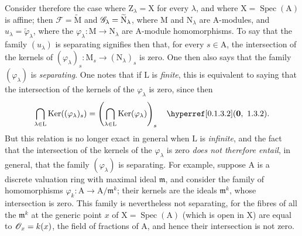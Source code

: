 \begin{env}[11.9.4]
\label{IV.11.9.4}
Consider therefore the case where $\mathrm{Z}_\lambda=\mathrm{X}$ for every $\lambda$, and where $\mathrm{X}=\operatorname{Spec}(\mathrm{A})$ is affine; then $\mathscr{F}=\widetilde{\mathrm{M}}$ and $\mathscr{G}_\lambda=\widetilde{\mathrm{N}}_\lambda$, where $\mathrm{M}$ and $\mathrm{N}_\lambda$ are $\mathrm{A}$-modules, and $u_\lambda=\widetilde{\varphi}_\lambda$, where the $\varphi_\lambda:\mathrm{M}\to\mathrm{N}_\lambda$ are $\mathrm{A}$-module homomorphisms.
To say that the family $(u_\lambda)$ is separating signifies then that, for every $s\in\mathrm{A}$, the intersection of the kernels of $(\varphi_\lambda)_s:\mathrm{M}_s\to(\mathrm{N}_\lambda)_s$ is zero.
One then also says that the family $(\varphi_\lambda)$ is \emph{separating}.
One notes that if $\mathrm{L}$ is \emph{finite}, this is equivalent to saying that the intersection of the kernels of the $\varphi_\lambda$ is zero, since then
\[
  \bigcap_{\lambda\in\mathrm{L}}\operatorname{Ker}((\varphi_\lambda)_s)
  =\left(\bigcap_{\lambda\in\mathrm{L}}\operatorname{Ker}(\varphi_\lambda)\right)_s
  \quad \sref[0]{0.1.3.2}.
\]
But this relation is no longer exact in general
when $\mathrm{L}$ is \emph{infinite}, and the fact that the intersection of the kernels of the $\varphi_\lambda$ is zero \emph{does not therefore entail},
in general, that the family $(\varphi_\lambda)$ is separating.
For example, suppose $\mathrm{A}$ is a discrete valuation ring with maximal ideal $\mathfrak{m}$, and consider the family of homomorphisms $\varphi_k:\mathrm{A}\to\mathrm{A}/\mathfrak{m}^k$; their kernels are the ideals $\mathfrak{m}^k$, whose intersection is zero. This family is nevertheless not separating, for the fibres of all the $\mathfrak{m}^k$ at the generic point $x$ of $\mathrm{X}=\operatorname{Spec}(\mathrm{A})$ (which is open in $\mathrm{X}$) are equal to $\mathscr{O}_x=k(x)$, the field of fractions of $\mathrm{A}$, and hence their intersection is not zero.
\end{env}

